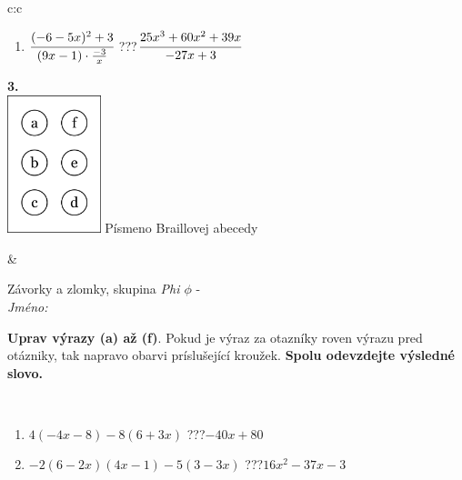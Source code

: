 \documentclass[10pt]{report}
\begin{document}
\begin{tabular}{c:c}
\begin{minipage}[c][104.5mm][t]{0.5\linewidth}
\begin{center}
\begin{minipage}{0.79\linewidth}
\begin{center}
\begin{varwidth}{\linewidth}
\begin{enumerate}
\item $\cfrac{(-6-5x)^2+3}{(9x-1)\cdot\frac{-3}{x}}$\quad \dotfill\; ???\;\dotfill \quad $\cfrac{25x^3+60x^2+39x}{-27x+3}$
\end{enumerate}
\end{varwidth}
\end{center}
\end{minipage}
\begin{minipage}{0.20\linewidth}
\begin{center}
{\Huge\bfseries 3.} \\[2mm]
\includegraphics[height=40mm]{../images/braille.png}
{\small Písmeno Braillovej abecedy}
\end{center}
\end{minipage}
\end{center}
\end{minipage}
&
\begin{minipage}[c][104.5mm][t]{0.5\linewidth}
\begin{center}
\vspace{7mm}
{\huge Závorky a zlomky, skupina \textit{Phi $\phi$} -}\\[5mm]
\textit{Jméno:}\phantom{xxxxxxxxxxxxxxxxxxxxxxxxxxxxxxxxxxxxxxxxxxxxxxxxxxxxxxxxxxxxxxxxx}\\[5mm]
\begin{minipage}{0.95\linewidth}
\begin{center}
\textbf{Uprav výrazy (a) až (f)}. Pokud je výraz za otazníky roven výrazu pred otázniky, tak napravo obarvi príslušející kroužek. \textbf{Spolu odevzdejte výsledné slovo.}
\end{center}
\end{minipage}
\\[1mm]
\begin{minipage}{0.79\linewidth}
\begin{center}
\begin{varwidth}{\linewidth}
\begin{enumerate}
\normalsize
\item $4(-4x-8)-8(6+3x)$\quad \dotfill\; ???\;\dotfill \quad $-40x+80$
\item $-2(6-2x)(4x-1)-5(3-3x)$\quad \dotfill\; ???\;\dotfill \quad $16x^2-37x-3$

\end{enumerate}
\end{varwidth}
\end{center}
\end{minipage}
\end{center}
\end{minipage}
\end{tabular}
\end{document}
